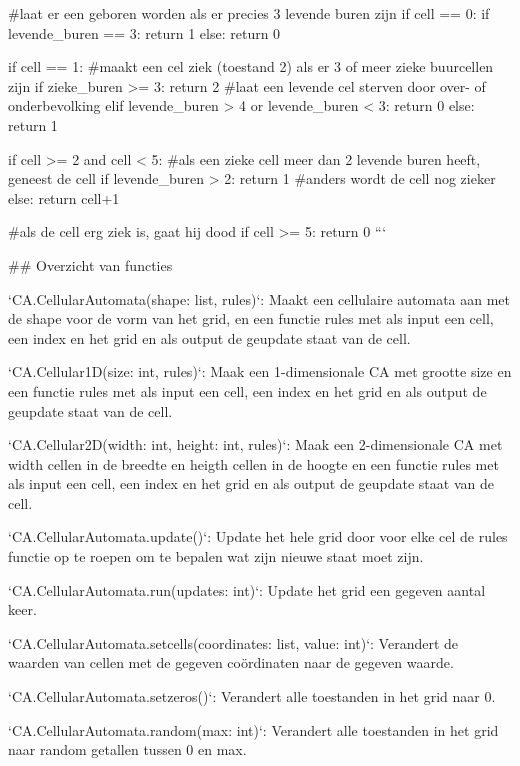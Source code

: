 \documentclass{article}
\begin{document}
\begin{markdown}
    #laat er een geboren worden als er precies 3 levende buren zijn      
    if cell == 0:
        if levende_buren == 3:
            return 1
        else:
            return 0


    if cell == 1:
        #maakt een cel ziek (toestand 2) als er 3 of meer zieke buurcellen zijn
        if zieke_buren >= 3:
            return 2
        #laat een levende cel sterven door over- of onderbevolking
        elif levende_buren > 4 or levende_buren < 3: 
            return 0
        else:
            return 1


    if cell >= 2 and cell < 5:
        #als een zieke cell meer dan 2 levende buren heeft, geneest de cell
        if levende_buren > 2:
            return 1
        #anders wordt de cell nog zieker
        else: 
            return cell+1
    
    #als de cell erg ziek is, gaat hij dood
    if cell >= 5:
        return 0
```

## Overzicht van functies

`CA.CellularAutomata(shape: list, rules)`: Maakt een cellulaire automata aan met de shape voor de vorm van het grid, en een functie rules met als input een cell, een index en het grid en als output de geupdate staat van de cell.

`CA.Cellular1D(size: int, rules)`: Maak een 1-dimensionale CA met grootte size en een functie rules met als input een cell, een index en het grid en als output de geupdate staat van de cell.

`CA.Cellular2D(width: int, height: int, rules)`: Maak een 2-dimensionale CA met width cellen in de breedte en heigth cellen in de hoogte en een functie rules met als input een cell, een index en het grid en als output de geupdate staat van de cell.

`CA.CellularAutomata.update()`: Update het hele grid door voor elke cel de rules functie op te roepen om te bepalen wat zijn nieuwe staat moet zijn.

`CA.CellularAutomata.run(updates: int)`: Update het grid een gegeven aantal keer.

`CA.CellularAutomata.setcells(coordinates: list, value: int)`: Verandert de waarden van cellen met de gegeven coördinaten naar de gegeven waarde.

`CA.CellularAutomata.setzeros()`: Verandert alle toestanden in het grid naar 0.

`CA.CellularAutomata.random(max: int)`: Verandert alle toestanden in het grid naar random getallen tussen 0 en max.


\end{markdown}
\end{document}
